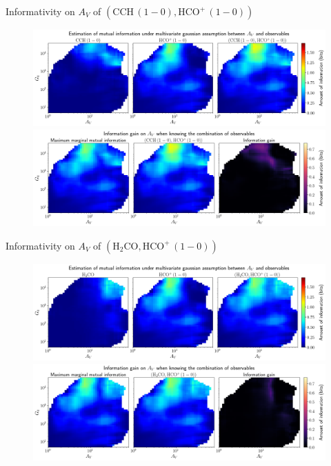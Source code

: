 \documentclass{beamer}
\begin{document}
\begin{frame}{Informativity on $A_V$ of $\left(\mathrm{CCH\,(1-0)},\mathrm{HCO^+\,(1-0)}\right)$}
    \begin{figure}
        \centering
        \includegraphics[width=0.95\linewidth]{../linearinfo/av__cch10_hcop10_linearinfo.png}
        \vfill
        \includegraphics[width=0.95\linewidth]{../linearinfo/av__cch10_hcop10_linearinfo_gain.png}
    \end{figure}
\end{frame}

\begin{frame}{Informativity on $A_V$ of $\left(\mathrm{H_2CO},\mathrm{HCO^+\,(1-0)}\right)$}
    \begin{figure}
        \centering
        \includegraphics[width=0.95\linewidth]{../linearinfo/av__h2co_hcop10_linearinfo.png}
        \vfill
        \includegraphics[width=0.95\linewidth]{../linearinfo/av__h2co_hcop10_linearinfo_gain.png}
    \end{figure}
\end{frame}
\end{document}
